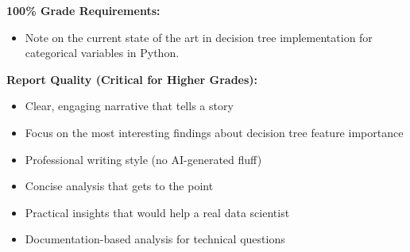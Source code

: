 \documentclass[
  letterpaper,
  DIV=11,
  numbers=noendperiod]{scrartcl}
\providecommand{\tightlist}{%
  \setlength{\itemsep}{0pt}\setlength{\parskip}{0pt}}
\begin{document}
\textbf{100\% Grade Requirements:}

\begin{itemize}
\tightlist
\item[$\square$]
  Note on the current state of the art in decision tree implementation
  for categorical variables in Python.
\end{itemize}

\textbf{Report Quality (Critical for Higher Grades):}

\begin{itemize}
\tightlist
\item[$\square$]
  Clear, engaging narrative that tells a story
\item[$\square$]
  Focus on the most interesting findings about decision tree feature
  importance
\item[$\square$]
  Professional writing style (no AI-generated fluff)
\item[$\square$]
  Concise analysis that gets to the point
\item[$\square$]
  Practical insights that would help a real data scientist
\item[$\square$]
  Documentation-based analysis for technical questions
\end{itemize}
\end{document}
